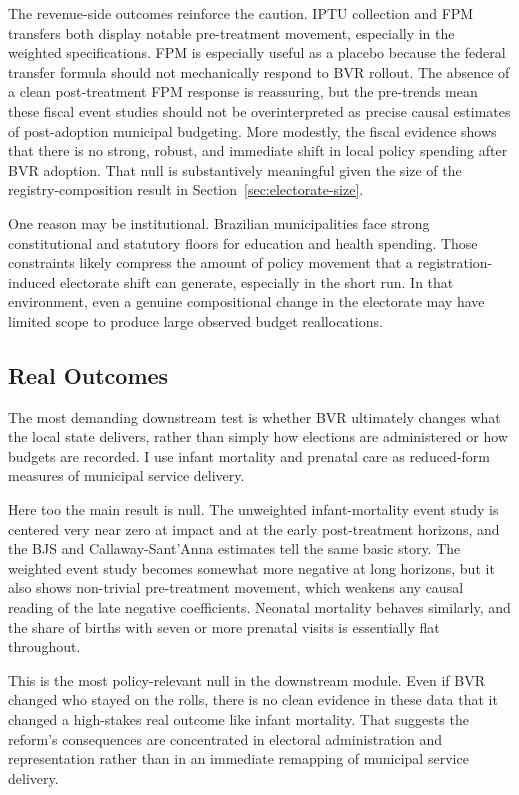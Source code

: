The revenue-side outcomes reinforce the caution. IPTU collection and FPM transfers both display notable pre-treatment movement, especially in the weighted specifications. FPM is especially useful as a placebo because the federal transfer formula should not mechanically respond to BVR rollout. The absence of a clean post-treatment FPM response is reassuring, but the pre-trends mean these fiscal event studies should not be overinterpreted as precise causal estimates of post-adoption municipal budgeting. More modestly, the fiscal evidence shows that there is no strong, robust, and immediate shift in local policy spending after BVR adoption. That null is substantively meaningful given the size of the registry-composition result in Section~\ref{sec:electorate-size}.

One reason may be institutional. Brazilian municipalities face strong constitutional and statutory floors for education and health spending. Those constraints likely compress the amount of policy movement that a registration-induced electorate shift can generate, especially in the short run. In that environment, even a genuine compositional change in the electorate may have limited scope to produce large observed budget reallocations.

\subsection{Real Outcomes}

The most demanding downstream test is whether BVR ultimately changes what the local state delivers, rather than simply how elections are administered or how budgets are recorded. I use infant mortality and prenatal care as reduced-form measures of municipal service delivery.

Here too the main result is null. The unweighted infant-mortality event study is centered very near zero at impact and at the early post-treatment horizons, and the BJS and Callaway-Sant'Anna estimates tell the same basic story. The weighted event study becomes somewhat more negative at long horizons, but it also shows non-trivial pre-treatment movement, which weakens any causal reading of the late negative coefficients. Neonatal mortality behaves similarly, and the share of births with seven or more prenatal visits is essentially flat throughout.

This is the most policy-relevant null in the downstream module. Even if BVR changed who stayed on the rolls, there is no clean evidence in these data that it changed a high-stakes real outcome like infant mortality. That suggests the reform's consequences are concentrated in electoral administration and representation rather than in an immediate remapping of municipal service delivery.

